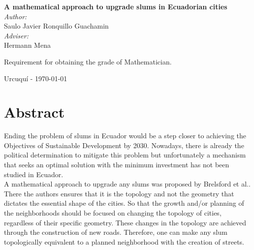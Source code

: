 \documentclass[10pt]{article}
\begin{document}
\begin{center}
  \vspace*{1cm}

  { \huge \bfseries A mathematical approach to upgrade slums in Ecuadorian 
cities}\\[0.4cm]	
  \vspace*{2cm}
  { \large 
    \emph{Author:} \\	
      Saulo Javier Ronquillo Guachamin \\
    \vspace*{1.5cm}
    \emph{Adviser:} \\
      Hermann Mena	\\
  }

  \vspace{2cm}
    Requirement for obtaining the grade of Mathematician.	\\	

  \vspace{3cm} 	
  \begin{center}
    {Urcuquí - \today}
  \end{center}
  
\end{center}
																		
\newpage																		

\tableofcontents 

\newpage
\section*{Abstract}
Ending the problem of slums in Ecuador would be a step closer to achieving the Objectives of Sustainable Development by 2030. Nowadays, there is already the political determination to mitigate this problem but unfortunately a mechanism that seeks an optimal solution with the minimum investment has not been studied in Ecuador.\\

A mathematical approach to upgrade any slums was proposed by Brelsford et al.\cite{bre}. There the authors ensures that it is the topology and not the geometry that dictates the essential shape of the cities. So that the growth and/or planning of the neighborhoods should be focused on changing the topology of cities, regardless of their specific geometry. These changes in the topology are achieved through the construction of new roads. Therefore, one can make any slum topologically equivalent to a planned neighborhood with the creation of streets.\\
\end{document}

